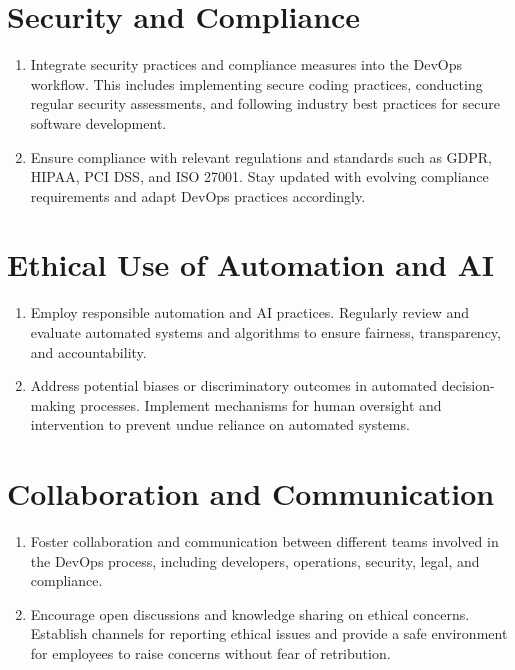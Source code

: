 \section*{Security and Compliance}
\begin{enumerate}
    \item Integrate security practices and compliance measures into the DevOps workflow. This includes implementing secure coding practices, conducting regular security assessments, and following industry best practices for secure software development.

    \item Ensure compliance with relevant regulations and standards such as GDPR, HIPAA, PCI DSS, and ISO 27001. Stay updated with evolving compliance requirements and adapt DevOps practices accordingly.
\end{enumerate}

\section*{Ethical Use of Automation and AI}
\begin{enumerate}
    \item Employ responsible automation and AI practices. Regularly review and evaluate automated systems and algorithms to ensure fairness, transparency, and accountability.

    \item Address potential biases or discriminatory outcomes in automated decision-making processes. Implement mechanisms for human oversight and intervention to prevent undue reliance on automated systems.
\end{enumerate}

\section*{Collaboration and Communication}
\begin{enumerate}
    \item Foster collaboration and communication between different teams involved in the DevOps process, including developers, operations, security, legal, and compliance.

    \item Encourage open discussions and knowledge sharing on ethical concerns. Establish channels for reporting ethical issues and provide a safe environment for employees to raise concerns without fear of retribution.
\end{enumerate}

